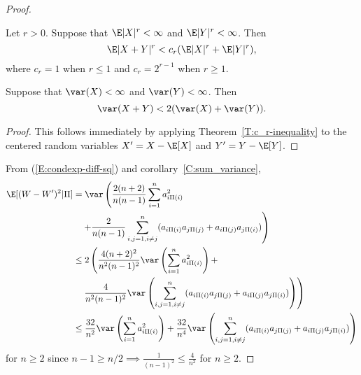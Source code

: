 \begin{theorem}
\begin{proof}
    \begin{theorem}
      \label{T:c_r-inequality}
      Let $r > 0$.  Suppose that $\E|X|^r < \infty$ and $\E|Y|^r < \infty$.  Then
      \begin{equation}
        \E|X + Y|^r < c_r(\E|X|^r+\E|Y|^r),
      \end{equation}
      where $c_r = 1$ when $r \leq 1$ and $c_r = 2^{r-1}$ when $r \geq 1$.
    \end{theorem}

    \begin{corollary}
      \label{C:sum_variance}
      Suppose that $\var(X) < \infty$ and $\var(Y) < \infty$.  Then
      \begin{equation}
        \var(X + Y) < 2(\var(X)+\var(Y)).
      \end{equation}
    \end{corollary}
    \begin{proof}
      This follows immediately by applying Theorem~\ref{T:c_r-inequality} to the centered random
      variables $X' = X - \E[X]$ and $Y' = Y - \E[Y]$.
    \end{proof}
    
    From (\ref{E:condexp-diff-sq}) and corollary~\ref{C:sum_variance},
    \begin{equation}
      \label{E:condexp-diff-sq2}
      \begin{split}
        \E [(W-W')^2 | \Pi] &= \var \left ( \frac{2(n+2)}{n(n-1)}\sum_{i=1}^n a_{i \Pi(i)}^2 
        \right . \\
        &\quad \left . + \frac{2}{n(n-1)}\sum_{i,j=1, i\neq j}^n (a_{i\Pi(i)}a_{j\Pi(j)} +
          a_{i\Pi(j)}a_{j\Pi(i)}) \right ) \\
        &\leq 2 \left ( \frac{4(n+2)^2}{n^2(n-1)^2} \var \left ( \sum_{i=1}^n a_{i \Pi(i)}^2 
          \right ) + \right . \\
        &\quad \left .\frac{4}{n^2(n-1)^2} \var \left ( \sum_{i,j=1, i\neq j}^n (a_{i\Pi(i)}a_{j\Pi(j)} +
            a_{i\Pi(j)}a_{j\Pi(i)}) \right ) \right ) \\
        &\leq \frac{32}{n^2}\var \left ( \sum_{i=1}^n a_{i \Pi(i)}^2 \right ) +
        \frac{32}{n^4} \var \left ( \sum_{i,j=1, i\neq j}^n (a_{i\Pi(i)}a_{j\Pi(j)} +
          a_{i\Pi(j)}a_{j\Pi(i)}) \right )
      \end{split}
    \end{equation}
    for $n \geq 2$ since $n-1 \geq n/2 \implies \frac{1}{(n-1)^2} \leq \frac{4}{n^2}$ for $n \geq 2$.


\end{proof}
\end{theorem}
